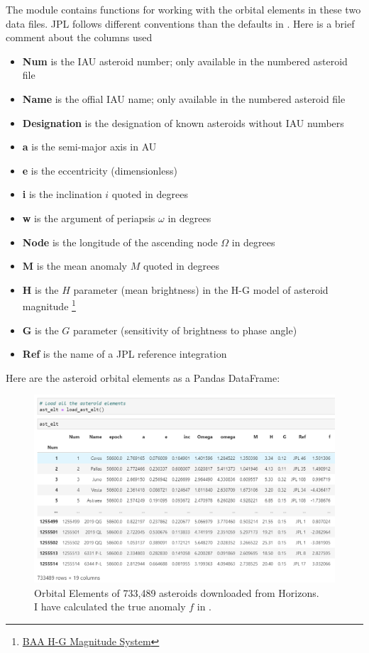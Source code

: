 The module  contains functions for working with the orbital elements in these two data files.
JPL follows different conventions than the defaults in .
Here is a brief comment about the columns used
\begin{itemize}
\item \textbf{Num} is the IAU asteroid number; only available in the numbered asteroid file
\item \textbf{Name} is the offial IAU name; only available in the numbered asteroid file
\item \textbf{Designation} is the designation of known asteroids without IAU numbers
\item \textbf{a} is the semi-major axis in AU
\item \textbf{e} is the eccentricity (dimensionless)
\item \textbf{i} is the inclination $i$ quoted in degrees
\item \textbf{w} is the argument of periapsis $\omega$ in degrees
\item \textbf{Node} is the longitude of the ascending node $\Omega$ in degrees
\item \textbf{M} is the mean anomaly $M$ quoted in degrees
\item \textbf{H} is the $H$ parameter (mean brightness) in the H-G model of asteroid magnitude 
\footnote{\href{https://www.britastro.org/asteroids/dymock4.pdf}{BAA H-G Magnitude System} }
\item \textbf{G} is the $G$ parameter (sensitivity of brightness to phase angle)
\item \textbf{Ref} is the name of a JPL reference integration
\end{itemize}

Here are the asteroid orbital elements as a Pandas DataFrame:
\begin{figure}[hbt!]
\begin{center}
\includegraphics[width=1.0\textwidth]{../figs/elts/ast_elt_dataframe.png}
\caption[Orbital Elements of 733,489 asteroids downloaded from Horizons]
{Orbital Elements of 733,489 asteroids downloaded from Horizons.\\
I have calculated the true anomaly $f$ in .}
\end{center}
\end{figure}

